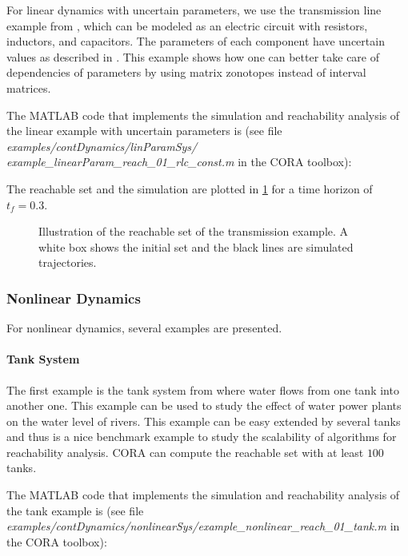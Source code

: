 For linear dynamics with uncertain parameters, we use the transmission line example from \cite[Sec.~4.5.2]{Althoff2011b}, which can be modeled as an electric circuit with resistors, inductors, and capacitors. The parameters of each component have uncertain values as described in \cite[Sec.~4.5.2]{Althoff2011b}. This example shows how one can better take care of dependencies of parameters by using matrix zonotopes instead of interval matrices.

The MATLAB code that implements the simulation and reachability analysis of the linear example with uncertain parameters is (see file \textit{examples/contDynamics/linParamSys/}\\ \textit{example\_linearParam\_reach\_01\_rlc\_const.m} in the CORA toolbox):
    {\small
}

The reachable set and the simulation are plotted in \cref{fig:example_linearParam_reach_01_rlc_const} for a time horizon of $t_f = 0.3$.
\begin{figure}[htb]
    \centering
    \footnotesize
    \caption{Illustration of the reachable set of the transmission example. A white box shows the initial set and the black lines are simulated trajectories.}
    \label{fig:example_linearParam_reach_01_rlc_const}
\end{figure}

\subsubsection{Nonlinear Dynamics}

For nonlinear dynamics, several examples are presented.

\paragraph{Tank System}
The first example is the tank system from \cite{Althoff2008c} where water flows from one tank into another one. This example can be used to study the effect of water power plants on the water level of rivers. This example can be easy extended by several tanks and thus is a nice benchmark example to study the scalability of algorithms for reachability analysis. CORA can compute the reachable set with at least $100$ tanks.

The MATLAB code that implements the simulation and reachability analysis of the tank example is (see file \textit{examples/contDynamics/nonlinearSys/}\textit{example\_nonlinear\_reach\_01\_tank.m} in the CORA toolbox):
    {\small
}

